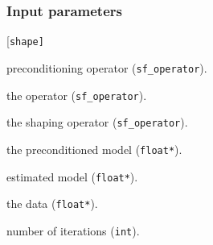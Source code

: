 \subsubsection*{Input parameters}
\begin{desclist}{\tt }{\quad}[\tt shape]
   \setlength\itemsep{0pt}
   \item[prec]  preconditioning operator (\texttt{sf\_operator}). 
   \item[oper]  the operator (\texttt{sf\_operator}). 
   \item[shape] the shaping operator (\texttt{sf\_operator}). 
   \item[p]     the preconditioned model (\texttt{float*}).  
   \item[x]     estimated model  (\texttt{float*}).  
   \item[dat]   the data (\texttt{float*}).  
   \item[niter] number of iterations (\texttt{int}).  
\end{desclist}



